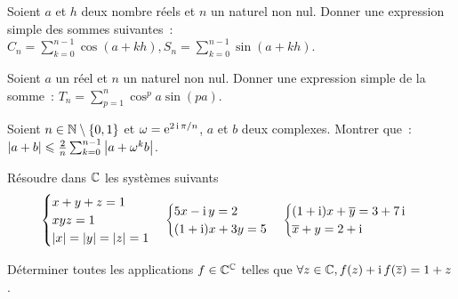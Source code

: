 \begin{exercice}
  Soient \(a\) et \(h\) deux nombre réels et \(n\) un naturel non nul. Donner
  une expression simple des sommes suivantes~: \( C_n = \sum_{k = 0}^{n-1}
  \cos(a + kh), S_n = \sum_{k = 0}^{n-1} \sin(a + kh)\).
\end{exercice}

\begin{exercice}
  Soient \(a\) un réel et \(n\) un naturel non nul. Donner une expression
  simple de la somme~: \(T_n = \sum_{p = 1}^n \cos^p a \sin(pa)\).
\end{exercice}

\begin{exercice}
  Soient \(n \in{}\mathbb{N}\setminus\{0,1\}\) et \(\omega = \operatorname{e}^{2\operatorname{i}\pi/n}\), \(a\) et
  \(b\) deux complexes. Montrer que~: \(\left\lvert a + b\right\rvert \leqslant \frac{2}{n}
  \sum_{k = 0}^{n-1} \left\lvert a + \omega^k b\right\rvert\).
\end{exercice}

\begin{exercice}
  Résoudre dans \(\mathbb{C}\) les systèmes suivants
  \begin{equation}
    \begin{cases} x + y + z = 1 \\ xyz = 1 \\ \left\lvert x\right\rvert = \left\lvert y\right\rvert = \left\lvert z\right\rvert =
    1 \end{cases}
    \begin{cases} 5x-\operatorname{i}{}y = 2 \\ (1 + \operatorname{i})x + 3y = 5 \end{cases}
      \begin{cases} (1 + \operatorname{i})x + \overline{y} = 3 + 7\operatorname{i}{}\\\overline{x} + y = 2 +
      \operatorname{i}\end{cases}
  \end{equation}
\end{exercice}

\begin{exercice}
  Déterminer toutes les applications \(f \in{}\mathbb{C}^{\mathbb{C}}\) telles que \(\forall z
  \in{}\mathbb{C}, f(z) + \operatorname{i}{}f(\overline{z}) = 1 + z\).
\end{exercice}

